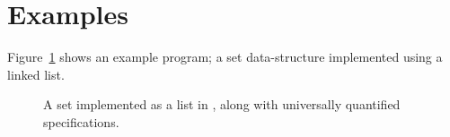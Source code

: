 \section{Examples}
Figure~\ref{fig:listset} shows an example program; a set data-structure
implemented using a linked list.

\begin{figure}

\caption{A set implemented as a list in \purescala, along with universally quantified specifications.}
\label{fig:listset}
\end{figure}

